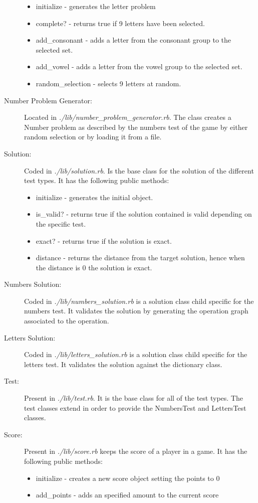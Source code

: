 \documentclass[a4paper,10pt,titlepage]{article}
\begin{document}
\begin{description}
	\begin{itemize}
		\item initialize - generates the letter problem 
		\item complete? - returns true if 9 letters have been selected.
		\item add\_consonant - adds a letter from the consonant group to the selected set. 
		\item add\_vowel - adds a letter from the vowel group to the selected set. 
		\item random\_selection - selects 9 letters at random. 
	\end{itemize} 
	\item[Number Problem Generator:] Located in \textit{./lib/number\_problem\_generator.rb}. The class creates a Number problem as described by the numbers test of the game by either random selection or by loading it from a file. 
	\item[Solution:] Coded in \textit{./lib/solution.rb}. Is the base class for the solution of the different test types. It has the following public methods:
	\begin{itemize}
		\item initialize - generates the initial object.
		\item is\_valid? - returns true if the solution contained is valid depending on the specific test.
		\item exact? - returns true if the solution is exact.
		\item distance - returns the distance from the target solution, hence when the distance is 0 the solution is exact.
	\end{itemize}
	\item[Numbers Solution:]  Coded in \textit{./lib/numbers\_solution.rb} is a solution class child specific for the numbers test. It validates the solution by generating the operation graph associated to the operation.
	\item[Letters Solution:] Coded in \textit{./lib/letters\_solution.rb} is a solution class child specific for the letters test. It validates the solution against the dictionary class. 
	\item[Test:] Present in \textit{./lib/test.rb}. It is the base class for all of the test types. The test classes extend in order to provide the NumbersTest and LettersTest classes. 
	\item[Score:] Present in \textit{./lib/score.rb} keeps the score of a player in a game. It has the following public methods:
	\begin{itemize}
		\item initialize - creates a new score object setting the points to 0
		\item add\_points - adds an specified amount to the current score
	\end{itemize}


\end{description}
\end{document}
